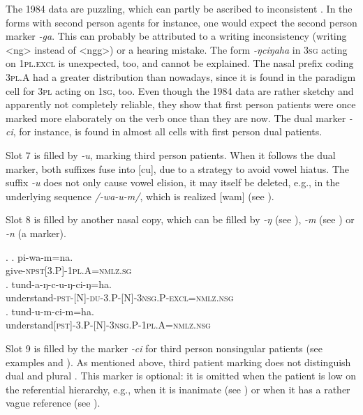 The 1984 data are puzzling, which can partly be ascribed to inconsistent . In the forms with second person agents for instance, one would expect the second person marker \emph{-ga}. This can probably be attributed to a writing inconsistency (writing <ng> instead of <ngg>) or a hearing mistake. The form \emph{-ŋciŋaha} in {\scshape 3sg} acting on {\scshape 1pl.excl} is unexpected, too, and cannot be explained. The nasal prefix coding {\scshape 3pl.A} had a greater distribution than nowadays, since it is found in the paradigm cell for {\scshape 3pl} acting on {\scshape 1sg}, too. Even though the 1984 data are rather sketchy and apparently not completely reliable, they show that first person patients were once marked more elaborately on the verb once than they are now. The dual  marker \emph{-ci}, for instance, is found in almost all cells with first person dual patients. 

Slot 7 is filled by  \emph{-u}, marking third person patients. When it follows the dual marker, both suffixes fuse into [cu], due to a strategy to avoid vowel hiatus. The suffix \emph{-u} does not only cause vowel elision, it may itself be deleted, e.g., in the underlying sequence \emph{/-wa-u-m/}, which is realized [wam] (see \Next[a]). 

Slot 8 is filled by another nasal copy, which can be filled by \emph{-ŋ} (see \Next[b]), \emph{-m} (see \Next[c]) or \emph{-n} (a  marker).

\ex. \ag. pi-wa-m=na.\\
	give{\scshape -npst[3.P]-1pl.A=nmlz.sg}\\
	\bg. tund-a-ŋ-c-u-ŋ-ci-ŋ=ha.\\
	understand{\scshape -pst-[N]-du-3.P-[N]-3nsg.P-excl=nmlz.nsg}\\
	\bg.	tund-u-m-ci-m=ha.\\
	understand{\scshape [pst]-3.P-[N]-3nsg.P-1pl.A=nmlz.nsg}\\

	
Slot 9  is filled by the marker \emph{-ci} for third person nonsingular patients (see examples \Last[b] and \Last[c]). As mentioned above, third   patient marking does not distinguish dual and plural . This marker is optional: it is omitted when the patient is low on the referential hierarchy, e.g., when it is inanimate (see \Next[a]) or when it has a rather vague reference (see \Next[b]). 



